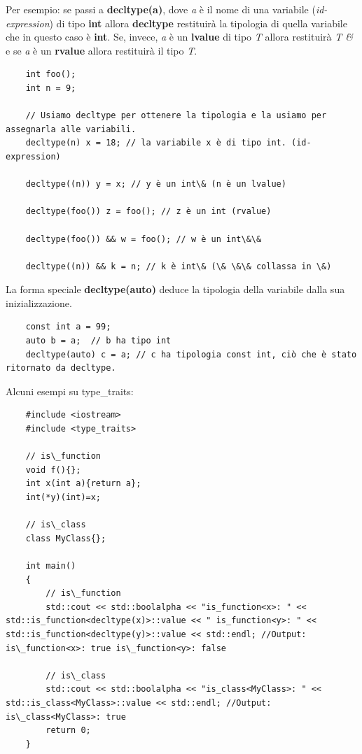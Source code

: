 \textsf{\small Per esempio: se passi a \textbf{decltype(a)}, dove \emph{a} è il nome di una variabile (\emph{id-expression}) di tipo \textbf{int} allora \textbf{decltype} restituirà la tipologia di quella variabile che in questo caso è \textbf{int}. Se, invece, \emph{a} è un \textbf{lvalue} di tipo \emph{T} allora restituirà \emph{T \&} e se \emph{a} è un \textbf{rvalue} allora restituirà il tipo \emph{T}.} \\

\begin{lstlisting}
	int foo();
	int n = 9;
	
	// Usiamo decltype per ottenere la tipologia e la usiamo per assegnarla alle variabili.
	decltype(n) x = 18; // la variabile x è di tipo int. (id-expression)
	
	decltype((n)) y = x; // y è un int\& (n è un lvalue)
	
	decltype(foo()) z = foo(); // z è un int (rvalue)
	
	decltype(foo()) && w = foo(); // w è un int\&\&
	
	decltype((n)) && k = n; // k è int\& (\& \&\& collassa in \&)
\end{lstlisting}

\textsf{\small La forma speciale \textbf{decltype(auto)} deduce la tipologia della variabile dalla sua inizializzazione.} \\

\begin{lstlisting}
	const int a = 99;
	auto b = a;  // b ha tipo int
	decltype(auto) c = a; // c ha tipologia const int, ciò che è stato ritornato da decltype.
\end{lstlisting}

\textsf{\small Alcuni esempi su type\_traits: } \\

\begin{lstlisting}
	#include <iostream>
	#include <type_traits>
	
	// is\_function
	void f(){};
	int x(int a){return a};
	int(*y)(int)=x;
	
	// is\_class
	class MyClass{};
	
	int main()
	{
		// is\_function
		std::cout << std::boolalpha << "is_function<x>: " << std::is_function<decltype(x)>::value << " is_function<y>: " << std::is_function<decltype(y)>::value << std::endl; //Output: is\_function<x>: true is\_function<y>: false
		
		// is\_class
		std::cout << std::boolalpha << "is_class<MyClass>: " << std::is_class<MyClass>::value << std::endl; //Output: is\_class<MyClass>: true
		return 0;
	}
\end{lstlisting}

